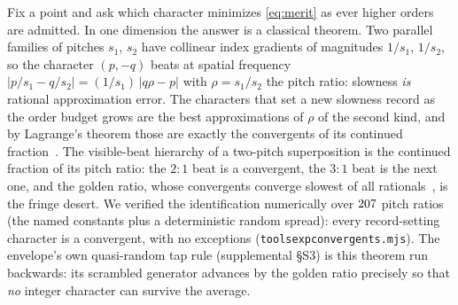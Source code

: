 Fix a point and ask which character minimizes \eqref{eq:merit} as ever higher
orders are admitted. In one dimension the answer is a classical theorem. Two
parallel families of pitches $s_1$, $s_2$ have collinear index gradients of
magnitudes $1/s_1$, $1/s_2$, so the character $(p,-q)$ beats at spatial
frequency $\lvert p/s_1-q/s_2\rvert=(1/s_1)\,\lvert q\rho-p\rvert$ with
$\rho=s_1/s_2$ the pitch ratio: slowness \emph{is} rational approximation
error. The characters that set a new slowness record as the order budget
grows are the best approximations of $\rho$ of the second kind, and by
Lagrange's theorem those are exactly the convergents of its continued
fraction~\cite{Khinchin1964Continued}. The visible-beat hierarchy of a
two-pitch superposition is the continued fraction of its pitch ratio: the
$2{:}1$ beat is a convergent, the $3{:}1$ beat is the next one, and the
golden ratio, whose convergents converge slowest of all
rationals~\cite{Hurwitz1891Annaherung}, is the fringe desert. We verified the
identification numerically over $207$ pitch ratios (the named
constants plus a deterministic random spread): every record-setting character
is a convergent, with no exceptions
(\texttt{tools\pslash exp\pslash convergents.mjs}). The envelope's own
quasi-random tap rule (supplemental \S S3) is this theorem run backwards: its
scrambled generator advances by the golden ratio precisely so that \emph{no}
integer character can survive the average.

